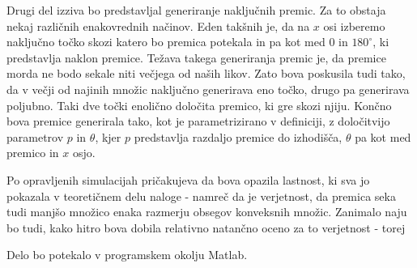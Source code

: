 \documentclass[a4paper]{article}
\begin{document}
Drugi del izziva bo predstavljal generiranje naključnih premic. Za to obstaja nekaj različnih enakovrednih načinov. Eden takšnih je, da na $x$ osi izberemo naključno točko skozi katero bo premica potekala in pa kot med $0$ in $180^\circ$, ki predstavlja naklon premice. Težava takega generiranja premic je, da premice morda ne bodo sekale niti večjega od naših likov. Zato bova poskusila tudi tako, da v večji od najinih množic naključno generirava eno točko, drugo pa generirava poljubno. Taki dve točki enolično določita premico, ki gre skozi njiju. Končno bova premice generirala tako, kot je parametrizirano v definiciji, z določitvijo parametrov $p$ in $\theta$, kjer $p$ predstavlja razdaljo premice do izhodišča, $\theta$ pa kot med premico in $x$ osjo.

Po opravljenih simulacijah pričakujeva da bova opazila lastnost, ki sva jo pokazala v teoretičnem delu naloge - namreč da je verjetnost, da premica seka tudi manjšo množico enaka razmerju obsegov konveksnih množic. Zanimalo naju bo tudi, kako hitro bova dobila relativno natančno oceno za to verjetnost - torej 

Delo bo potekalo v programskem okolju Matlab.

 
\end{document}
